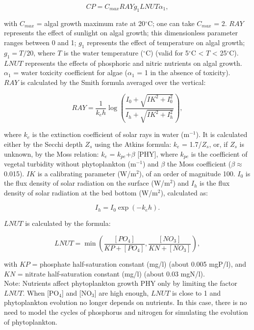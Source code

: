 \begin{equation}
  CP = C_{max} RAY g_1 LNUT \alpha_1,
\end{equation}

with $C_{max}$ = algal growth maximum rate at 20$^{\circ}$C; one can take $C_{max}$ = 2.
$RAY$ represents the effect of sunlight on algal growth;
this dimensionless parameter ranges between 0 and 1;
$g_1$ represents the effect of temperature on algal growth;
$g_1 = T/20$, where $T$ is the water temperature ($^{\circ}$C) (valid for 5$^{\circ}$C < $T$ < 25$^{\circ}$C).
$LNUT$ represents the effects of phosphoric and nitric nutrients on algal growth.
$\alpha_1$ = water toxicity coefficient for algae ($\alpha_1$ = 1 in the absence of toxicity).\\
$RAY$ is calculated by the Smith formula averaged over the vertical:

\begin{equation}
  RAY = \frac{1}{k_e h} \log \left( \frac{I_0 + \sqrt{IK^2+I_0^2} }{ I_h + \sqrt{IK^2+I_h^2} }  \right),
\end{equation}

where $k_e$ is the extinction coefficient of solar rays in water (m$^{-1}$).
It is calculated either by the Secchi depth $Z_s$ using the Atkins formula: $k_e$ = 1.7/$Z_s$, or,
if $Z_s$ is unknown, by the Moss relation: $k_e$ = $k_{pe}$+$ \beta $ [PHY],
where $k_{pe}$ is the coefficient of vegetal turbidity without phytoplankton (m$^{-1}$)
and $ \beta $  the Moss coefficient ($ \beta \approx$ 0.015).
$IK$ is a calibrating parameter (W/m$^2$), of an order of magnitude 100.
$I_0$ is the flux density of solar radiation on the surface (W/m$^2$)
and $I_h$ is the flux density of solar radiation at the bed bottom (W/m$^2$), calculated as:

\begin{equation}
  I_h = I_0 \exp (-k_e h).
\end{equation}

$LNUT$ is calculated by the formula:

\begin{equation}
  LNUT = \min \left( \frac{[PO_4]}{KP+[PO_4]}, \frac{[NO_3]}{KN+[NO_3]} \right),
\end{equation}

with $KP$ = phosphate half-saturation constant (mg/l) (about 0.005 mgP/l),
and $KN$ = nitrate half-saturation constant (mg/l) (about 0.03 mgN/l).\\

Note: Nutrients affect phytoplankton growth PHY only by limiting the factor $LNUT$.
When [PO$_4$] and [NO$_3$] are high enough, $LNUT$ is close to 1 and
phytoplankton evolution no longer depends on nutrients.
In this case, there is no need to model the cycles of phosphorus and nitrogen
for simulating the evolution of phytoplankton.

